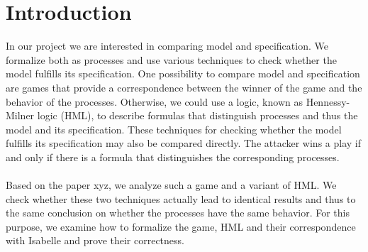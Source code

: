 \newpage
\section{Introduction}
In our project we are interested in comparing model and specification.
We formalize both as processes and use various techniques to check whether the model fulfills its specification.
One possibility to compare model and specification are games that provide a correspondence between the winner of the game and the behavior of the processes.
Otherwise, we could use a logic, known as Hennessy-Milner logic (HML), to describe formulas that distinguish processes and thus the model and its specification.
These techniques for checking whether the model fulfills its specification may also be compared directly.
The attacker wins a play if and only if there is a formula that distinguishes the corresponding processes.
\\\\
Based on the paper xyz, we analyze such a game and a variant of HML.
We check whether these two techniques actually lead to identical results and thus to the same conclusion on whether the processes have the same behavior.
For this purpose, we examine how to formalize the game, HML and their correspondence with Isabelle and prove their correctness.
